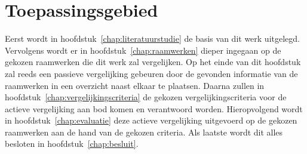 \section{Toepassingsgebied} %

Eerst wordt in hoofdstuk~\ref{chap:literatuurstudie} de basis van dit werk uitgelegd.
Vervolgens wordt er in hoofdstuk~\ref{chap:raamwerken} dieper ingegaan op de gekozen raamwerken die dit werk zal vergelijken.
Op het einde van dit hoofdstuk zal reeds een passieve vergelijking gebeuren door de gevonden informatie van de raamwerken in een overzicht naast elkaar te plaatsen.
Daarna zullen in hoofdstuk~\ref{chap:vergelijkingscriteria} de gekozen vergelijkingscriteria voor de actieve vergelijking aan bod komen en verantwoord worden.
Hieropvolgend wordt in hoofdstuk~\ref{chap:evaluatie} deze actieve vergelijking uitgevoerd op de gekozen raamwerken aan de hand van de gekozen criteria.
Als laatste wordt dit alles besloten in hoofdstuk~\ref{chap:besluit}.

